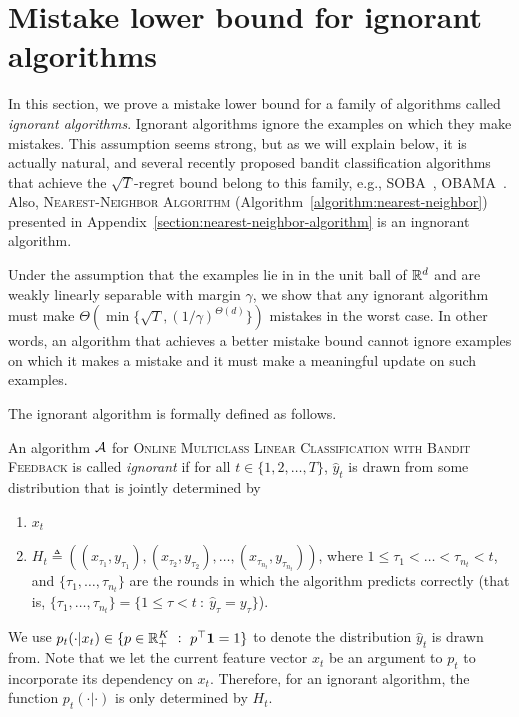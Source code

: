 \section{Mistake lower bound for ignorant algorithms}
\label{section:mistake-lower-bound-for-ignorant-algorithms}

In this section, we prove a mistake lower bound for a family of algorithms
called \textit{ignorant algorithms}. Ignorant algorithms ignore the examples on
which they make mistakes. This assumption seems strong, but as we will explain
below, it is actually natural, and several recently proposed bandit
classification algorithms that achieve the $\sqrt{T}$-regret bound belong to
this family, e.g., SOBA~\citep{Beygelzimer-Orabona-Zhang-2017},
OBAMA~\citep{Foster-Kale-Luo-Mohri-Sridharan-2018}. Also,
\textsc{Nearest-Neighbor Algorithm} (Algorithm~\ref{algorithm:nearest-neighbor})
presented in Appendix~\ref{section:nearest-neighbor-algorithm} is an ingnorant
algorithm.

Under the assumption that the examples lie in in the unit ball of $\mathbb{R}^d$ and are
weakly linearly separable with margin $\gamma$, we show that any ignorant
algorithm must make $\Theta\left(\min\{\sqrt{T},
(1/\gamma)^{\Theta(d)}\}\right)$ mistakes in the worst case. In other words, an
algorithm that achieves a better mistake bound cannot ignore examples on which
it makes a mistake and it must make a meaningful update on such examples.

The ignorant algorithm is formally defined as follows.
\begin{definition}
\label{definition:ignorant-algorithm}
An algorithm $\mathcal{A}$ for \textsc{Online Multiclass Linear Classification with
Bandit Feedback} is called \emph{ignorant} if for all $t \in \{1,2,\dots,T\}$,
$\widehat y_t$ is drawn from some distribution that is jointly determined by
\begin{enumerate}
\item $x_t$
\item $H_t \triangleq \left( (x_{\tau_1}, y_{\tau_1}), (x_{\tau_2}, y_{\tau_2}), \ldots, (x_{\tau_{n_t}}, y_{\tau_{n_t}}) \right)$,
where $1 \le \tau_1 < \dots < \tau_{n_t} < t$, and $\{\tau_1, \ldots, \tau_{n_t}\}$
are the rounds in which the algorithm predicts correctly (that is,
$\{\tau_1, \dots, \tau_{n_t}\} = \{1 \le \tau < t ~:~ \widehat y_\tau=y_\tau\}$).
\end{enumerate}
We use $p_t(\cdot|x_t)\in \{p\in \mathbb{R}_+^K ~:~ p^\top\mathbf{1}=1\}$ to denote
the distribution $\widehat y_t$ is drawn from. Note that we let the current
feature vector $x_t$ be an argument to $p_t$ to incorporate its dependency on
$x_t$. Therefore, for an ignorant algorithm, the function $p_t(\cdot|\cdot)$ is
only determined by $H_t$.
\end{definition}


